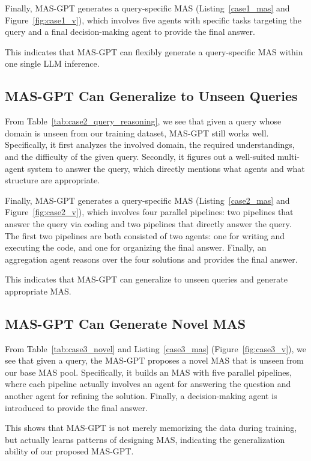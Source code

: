 \documentclass{article}
\theoremstyle{plain}
\theoremstyle{definition}
\theoremstyle{remark}
\begin{document}
Finally, MAS-GPT generates a query-specific MAS (Listing~\ref{case1_mas} and Figure~\ref{fig:case1_v}), which involves five agents with specific tasks targeting the query and a final decision-making agent to provide the final answer.

This indicates that MAS-GPT can flexibly generate a query-specific MAS within one single LLM inference.

\subsection{MAS-GPT Can Generalize to Unseen Queries}
\label{app:case2}

From Table~\ref{tab:case2_query_reasoning}, we see that given a query whose domain is unseen from our training dataset, MAS-GPT still works well.
Specifically, it first analyzes the involved domain, the required understandings, and the difficulty of the given query.
Secondly, it figures out a well-suited multi-agent system to answer the query, which directly mentions what agents and what structure are appropriate.

Finally, MAS-GPT generates a query-specific MAS (Listing~\ref{case2_mas} and Figure~\ref{fig:case2_v}), which involves four parallel pipelines: two pipelines that answer the query via coding and two pipelines that directly answer the query.
The first two pipelines are both consisted of two agents: one for writing and executing the code, and one for organizing the final answer.
Finally, an aggregation agent reasons over the four solutions and provides the final answer.

This indicates that MAS-GPT can generalize to unseen queries and generate appropriate MAS.

\subsection{MAS-GPT Can Generate Novel MAS}
\label{app:case3}

From Table~\ref{tab:case3_novel} and Listing~\ref{case3_mas} (Figure~\ref{fig:case3_v}), we see that given a query, the MAS-GPT proposes a novel MAS that is unseen from our base MAS pool.
Specifically, it builds an MAS with five parallel pipelines, where each pipeline actually involves an agent for answering the question and another agent for refining the solution.
Finally, a decision-making agent is introduced to provide the final answer.

This shows that MAS-GPT is not merely memorizing the data during training, but actually learns patterns of designing MAS, indicating the generalization ability of our proposed MAS-GPT.
\end{document}
